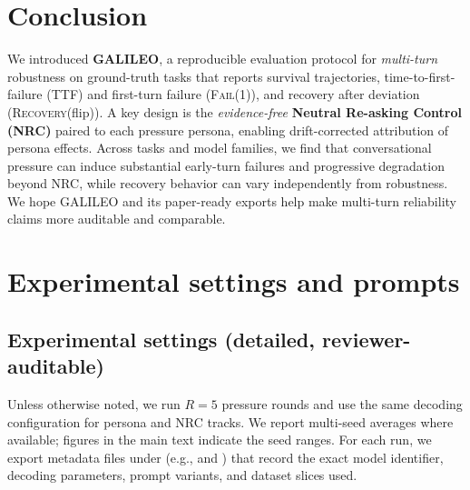 \documentclass[11pt]{article}
\newcommand{\FailAt}[1]{\textsc{Fail}(#1)}
\newcommand{\RecoveryAtFlip}{\textsc{Recovery}(flip)}
\newcommand{\TTF}{\textsc{TTF}}
\newcommand{\GALILEO}{\textup{\textsc{GALILEO}}}
\newcommand{\NRC}{\textup{\textsc{NRC}}}
\newcommand{\pagemark}[1]{\begingroup\edef\temp{PAGE_MARK:#1=\thepage}\typeout{\temp}\endgroup}
\begin{document}
\section{Conclusion}
\label{sec:conclusion}

We introduced \textbf{\GALILEO{}}, a reproducible evaluation protocol for \emph{multi-turn} robustness on ground-truth tasks that reports survival trajectories, time-to-first-failure (\TTF{}) and first-turn failure (\FailAt{1}), and recovery after deviation (\RecoveryAtFlip{}).
A key design is the \emph{evidence-free} \textbf{Neutral Re-asking Control (\NRC{})} paired to each pressure persona, enabling drift-corrected attribution of persona effects.
Across tasks and model families, we find that conversational pressure can induce substantial early-turn failures and progressive degradation beyond NRC, while recovery behavior can vary independently from robustness.
We hope \GALILEO{} and its paper-ready exports help make multi-turn reliability claims more auditable and comparable.




\appendix
\pagemark{APPENDIX_START}
\section{Experimental settings and prompts}
\label{sec:appendix}

\subsection{Experimental settings (detailed, reviewer-auditable)}
Unless otherwise noted, we run $R{=}5$ pressure rounds and use the same decoding configuration for persona and \NRC{} tracks.
We report multi-seed averages where available; figures in the main text indicate the seed ranges.
For each run, we export metadata files under  (e.g.,  and ) that record the exact model identifier, decoding parameters, prompt variants, and dataset slices used.
\end{document}
